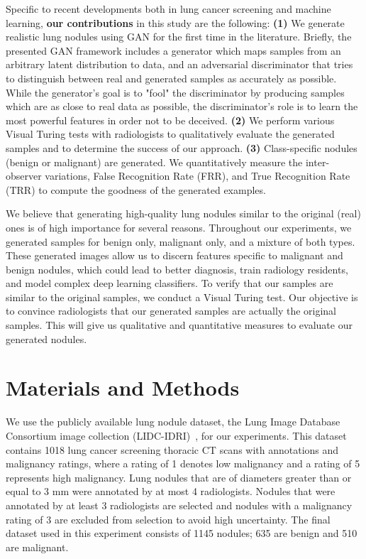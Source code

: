 \documentclass{article}
\begin{document}
Specific to recent developments both in lung cancer screening and machine learning, \textbf{our contributions} in this study are the following: \textbf{(1)} We generate realistic lung nodules using GAN for the first time in the literature. Briefly, the presented GAN framework includes a generator which maps samples from an arbitrary latent distribution to data, and an adversarial discriminator that tries to distinguish between real and generated samples as accurately as possible. While the generator's goal is to "fool" the discriminator by producing samples which are as close to real data as possible, the discriminator's role is to learn the most powerful features in order not to be deceived.
\vspace{-1 px}
\textbf{(2)} We perform various Visual Turing tests with radiologists to qualitatively evaluate the generated samples and to determine the success of our approach.
\vspace{-1 px}
\textbf{(3)} Class-specific nodules (benign or malignant) are generated. We quantitatively measure the inter-observer variations, False Recognition Rate (FRR), and True Recognition Rate (TRR) to compute the goodness of the generated examples.
\vspace{-1 px}

We believe that generating high-quality lung nodules similar to the original (real) ones is of high importance for several reasons. Throughout our experiments, we generated samples for benign only, malignant only, and a mixture of both types. These generated images allow us to discern features specific to malignant and benign nodules, which could lead to better diagnosis, train radiology residents, and model complex deep learning classifiers. To verify that our samples are similar to the original samples, we conduct a Visual Turing test. Our objective is to convince radiologists that our generated samples are actually the original samples. This will give us qualitative and quantitative measures to evaluate our generated nodules. 

\section{Materials and Methods}
\label{sec:materials}
We use the publicly available lung nodule dataset, the Lung Image Database Consortium image collection (LIDC-IDRI)~\cite{armato2011lung}, for our experiments. This dataset contains 1018 lung cancer screening thoracic CT scans with annotations and malignancy ratings, where a rating of 1 denotes low malignancy and a rating of 5 represents high malignancy. Lung nodules that are of diameters greater than or equal to 3 mm were annotated by at most 4 radiologists. Nodules that were annotated by at least 3 radiologists are selected and nodules with a malignancy rating of 3 are excluded from selection to avoid high uncertainty. The final dataset used in this experiment consists of 1145 nodules; 635 are benign and 510 are malignant.
\end{document}
